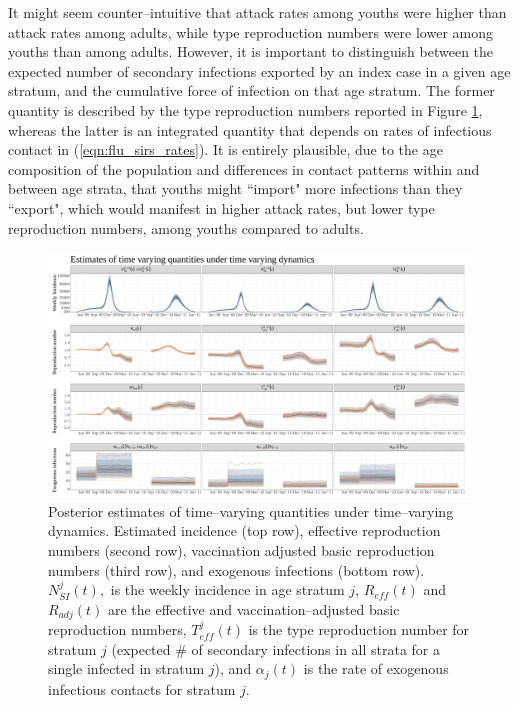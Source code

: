 It might seem counter--intuitive that attack rates among youths were higher than attack rates among adults, while type reproduction numbers were lower among youths than among adults. However, it is important to distinguish between the expected number of secondary infections exported by an index case in a given age stratum, and the cumulative force of infection on that age stratum. The former quantity is described by the type reproduction numbers reported in Figure \ref{fig:flurwodetimevaryingplots}, whereas the latter is an integrated quantity that depends on rates of infectious contact in (\ref{eqn:flu_sirs_rates}). It is entirely plausible, due to the age composition of the population and differences in contact patterns within and between age strata, that youths might ``import" more infections than they ``export", which would manifest in higher attack rates, but lower type reproduction numbers, among youths compared to adults.

\begin{figure}
	\centering
	\includegraphics[width=0.95\linewidth]{figures/flu_rw_ode_timevarying_plots}
	\caption[Estimated A(H1N1) incidence, reproduction numbers, and rates of exogenous infection under time--varying dynamics.]{Posterior estimates of time--varying quantities under time--varying dynamics. Estimated incidence (top row), effective reproduction numbers (second row), vaccination adjusted basic reproduction numbers (third row), and exogenous infections (bottom row). $ N_{SI}^j(t), $ is the weekly incidence in age stratum $ j $, $ R_{eff}(t) $ and $ R_{adj}(t) $ are the effective and vaccination--adjusted basic reproduction numbers, $ T_{eff}^j(t) $ is the type reproduction number for stratum $ j $ (expected \# of secondary infections in all strata for a single infected in stratum $ j $), and $ \alpha_j(t) $ is the rate of exogenous infectious contacts for stratum $ j $.}
	\label{fig:flurwodetimevaryingplots}
\end{figure}

